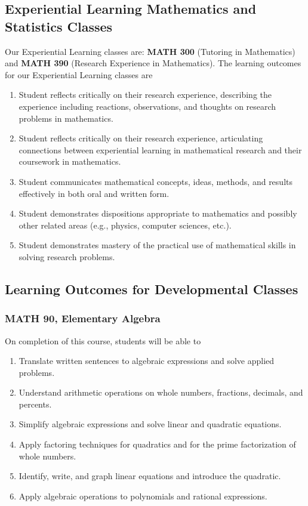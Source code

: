 \documentclass[11pt]{article}
\newenvironment{alphalist}{
\begin{enumerate}[label=(\arabic*),widest=107 ,leftmargin=25pt, itemsep=0pt]}
{\end{enumerate}}
\begin{document}
\subsection{Experiential Learning Mathematics and Statistics Classes}

Our Experiential Learning classes are: \textbf{MATH 300} 
(Tutoring in Mathematics) and \textbf{MATH 390} (Research Experience in Mathematics).
The learning outcomes for our Experiential Learning classes are
\begin{alphalist}
    \item  Student reflects critically on their research experience, describing the experience including reactions, observations, and thoughts on research problems in mathematics.
\item Student reflects critically on their research experience, articulating connections between experiential learning in mathematical research and their coursework in mathematics.
\item Student communicates mathematical concepts, ideas, methods, and results effectively in both oral and written form. 
\item Student demonstrates dispositions appropriate to mathematics and possibly other related areas (e.g., physics, computer sciences, etc.).
\item Student demonstrates mastery of the practical use of mathematical skills in solving research problems.
\end{alphalist}

\subsection{Learning Outcomes for Developmental Classes}

\subsubsection{MATH 90, Elementary Algebra}

On completion of this course, students will  be able to 
\begin{alphalist}
    \item Translate written sentences to algebraic expressions and solve applied problems.
    \item Understand arithmetic operations on whole numbers, fractions, decimals, and percents.
    \item Simplify algebraic expressions and solve linear and quadratic equations.
    \item Apply factoring techniques for quadratics and for the prime factorization of whole numbers.
    \item Identify, write, and graph linear equations and introduce the quadratic.
    \item Apply algebraic operations to polynomials and rational expressions.
\end{alphalist}
\end{document}

